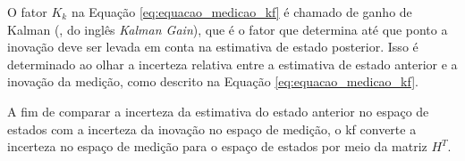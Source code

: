 \documentclass[acronym, symbols, table, deposito]{fei}
\begin{document}
%				
%			
				
				O fator $K_k$ na Equação \eqref{eq:equacao_medicao_kf} é chamado de ganho de Kalman (, do inglês \textit{Kalman Gain}), que é o fator que determina até que ponto a inovação deve ser levada em conta na estimativa de estado posterior. Isso é determinado ao olhar a incerteza relativa entre a estimativa de estado anterior e a inovação da medição, como descrito na Equação \eqref{eq:equacao_medicao_kf}.
				
				A fim de comparar a incerteza da estimativa do estado anterior no espaço de estados com a incerteza da inovação no espaço de medição, o \acrshort{kf} converte a incerteza no espaço de medição para o espaço de estados por meio da matriz $H^T$.
				
\end{document}
